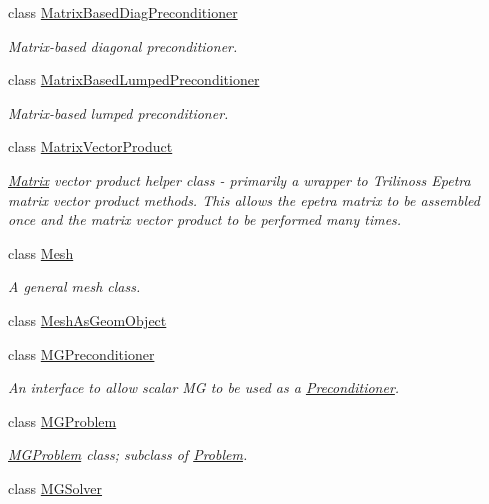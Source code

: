\begin{DoxyCompactItemize}
class \hyperlink{classoomph_1_1MatrixBasedDiagPreconditioner}{Matrix\+Based\+Diag\+Preconditioner}
\begin{DoxyCompactList}\small\item\em Matrix-\/based diagonal preconditioner. \end{DoxyCompactList}\item 
class \hyperlink{classoomph_1_1MatrixBasedLumpedPreconditioner}{Matrix\+Based\+Lumped\+Preconditioner}
\begin{DoxyCompactList}\small\item\em Matrix-\/based lumped preconditioner. \end{DoxyCompactList}\item 
class \hyperlink{classoomph_1_1MatrixVectorProduct}{Matrix\+Vector\+Product}
\begin{DoxyCompactList}\small\item\em \hyperlink{classoomph_1_1Matrix}{Matrix} vector product helper class -\/ primarily a wrapper to Trilinos\textquotesingle{}s Epetra matrix vector product methods. This allows the epetra matrix to be assembled once and the matrix vector product to be performed many times. \end{DoxyCompactList}\item 
class \hyperlink{classoomph_1_1Mesh}{Mesh}
\begin{DoxyCompactList}\small\item\em A general mesh class. \end{DoxyCompactList}\item 
class \hyperlink{classoomph_1_1MeshAsGeomObject}{Mesh\+As\+Geom\+Object}
\item 
class \hyperlink{classoomph_1_1MGPreconditioner}{M\+G\+Preconditioner}
\begin{DoxyCompactList}\small\item\em An interface to allow scalar MG to be used as a \hyperlink{classoomph_1_1Preconditioner}{Preconditioner}. \end{DoxyCompactList}\item 
class \hyperlink{classoomph_1_1MGProblem}{M\+G\+Problem}
\begin{DoxyCompactList}\small\item\em \hyperlink{classoomph_1_1MGProblem}{M\+G\+Problem} class; subclass of \hyperlink{classoomph_1_1Problem}{Problem}. \end{DoxyCompactList}\item 
class \hyperlink{classoomph_1_1MGSolver}{M\+G\+Solver}
\item 

\end{DoxyCompactItemize}
